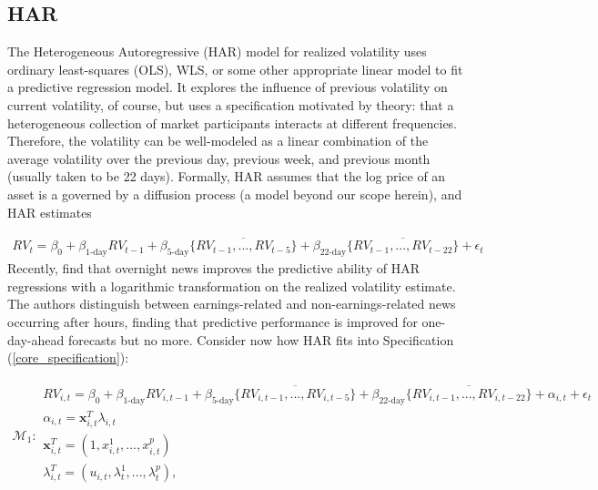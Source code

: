 \documentclass{uiucthesis2021}
\newcommand{\xx}{\textbf{x}}
\def\mc#1{\mathcal{#1}} %
\def\mc#1{\mathcal{#1}}
\theoremstyle{definition}
\begin{document}
  \subsection{HAR}
  
  The Heterogeneous Autoregressive (HAR) model for realized volatility \parencite[][]{corsi2009simple}  uses ordinary least-squares (OLS), WLS, or some other appropriate linear model to fit a predictive regression model.  It explores the influence of previous volatility on current volatility, of course, but uses a specification motivated by theory: that a heterogeneous collection of market participants interacts at different frequencies.  Therefore, the volatility can be well-modeled as a linear combination of the average volatility over the previous day, previous week, and previous month (usually taken to be 22 days).  Formally, HAR assumes that the log price of an asset is a governed by a diffusion process (a model beyond our scope herein), and HAR estimates
  
  \begin{align*}
  RV_{t} = \beta_{0} + \beta_{\text{1-day}}RV_{t-1} + \beta_{\text{5-day}}\overline{\{RV_{t-1},...,RV_{t-5}\}}+\beta_{\text{22-day}}\overline{\{RV_{t-1},...,RV_{t-22}\}} + \epsilon_{t}
  \end{align*}
  Recently, \cite[][]{bodilsen2023exploiting} find that overnight news improves the predictive ability of HAR regressions with a logarithmic transformation on the realized volatility estimate.  The authors distinguish between earnings-related and non-earnings-related news occurring after hours, finding that predictive performance is improved for one-day-ahead forecasts but no more.  Consider now how HAR fits into Specification (\ref{core_specification}):
  
  \begin{align}
    \mc{M}_1 \colon \begin{array}{l}
      RV_{i,t} = \beta_{0} + \beta_{\text{1-day}}RV_{i,t-1} + \beta_{\text{5-day}}\overline{\{RV_{i,t-1},...,RV_{i,t-5}\}}+\beta_{\text{22-day}}\overline{\{RV_{i,t-1},...,RV_{i,t-22}\}} + \alpha_{i,t} + \epsilon_{t}\\[.2cm]
      \alpha_{i,t} = \xx^{T}_{i,t}\lambda_{i,t} \\[.2cm]
      \xx_{i,t}^{T} = (1,x^{1}_{i,t},...,x^{p}_{i,t})\\[.2cm] 
      \lambda_{i,t}^{T} = (u_{i,t},\lambda^{1}_{t},...,\lambda^{p}_{t}),\\[.2cm]
    \end{array}
    \end{align}
  
\end{document}
